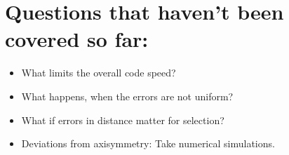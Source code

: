 \section{Questions that haven't been covered so far:}

\begin{itemize}
\item What limits the overall code speed?
\item What happens, when the errors are not uniform?
\item What if errors in distance matter for selection?
\item Deviations from axisymmetry: Take numerical simulations.
\end{itemize}


